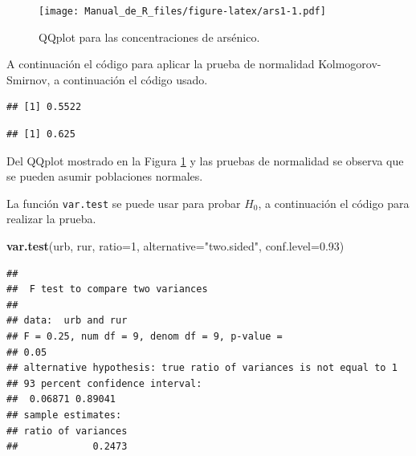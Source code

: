 \documentclass[10pt,]{krantz}
\makeatletter
\newenvironment{Shaded}{\begin{snugshade}}{\end{snugshade}}
\newcommand{\KeywordTok}[1]{\textcolor[rgb]{0.13,0.29,0.53}{\textbf{{#1}}}}
\newcommand{\DataTypeTok}[1]{\textcolor[rgb]{0.13,0.29,0.53}{{#1}}}
\newcommand{\DecValTok}[1]{\textcolor[rgb]{0.00,0.00,0.81}{{#1}}}
\newcommand{\FloatTok}[1]{\textcolor[rgb]{0.00,0.00,0.81}{{#1}}}
\newcommand{\StringTok}[1]{\textcolor[rgb]{0.31,0.60,0.02}{{#1}}}
\newcommand{\NormalTok}[1]{{#1}}
\newenvironment{kframe}{%
\medskip{}
\setlength{\fboxsep}{.8em}
 \def\at@end@of@kframe{}%
 \ifinner\ifhmode%
  \def\at@end@of@kframe{\end{minipage}}%
  \begin{minipage}{\columnwidth}%
 \fi\fi%
 \def\FrameCommand##1{\hskip\@totalleftmargin \hskip-\fboxsep
 \colorbox{shadecolor}{##1}\hskip-\fboxsep
     \hskip-\linewidth \hskip-\@totalleftmargin \hskip\columnwidth}%
 \MakeFramed {\advance\hsize-\width
   \@totalleftmargin\z@ \linewidth\hsize
   \@setminipage}}%
 {\par\unskip\endMakeFramed%
 \at@end@of@kframe}
\renewenvironment{Shaded}{\begin{kframe}}{\end{kframe}}
\makeatother
\begin{document}
\begin{figure}[htbp]
\centering
\texttt{[image: Manual\_de\_R\_files/figure-latex/ars1-1.pdf]}
\caption{\label{fig:ars1}QQplot para las concentraciones de arsénico.}
\end{figure}

A continuación el código para aplicar la prueba de normalidad
Kolmogorov-Smirnov, a continuación el código usado.

\begin{Shaded}
\end{Shaded}

\begin{verbatim}
## [1] 0.5522
\end{verbatim}

\begin{Shaded}
\end{Shaded}

\begin{verbatim}
## [1] 0.625
\end{verbatim}

Del QQplot mostrado en la Figura \ref{fig:ars1} y las pruebas de
normalidad se observa que se pueden asumir poblaciones normales.

La función \texttt{var.test} se puede usar para probar \(H_0\), a
continuación el código para realizar la prueba.

\begin{Shaded}
\begin{Highlighting}[]
\KeywordTok{var.test}\NormalTok{(urb, rur, }\DataTypeTok{ratio=}\DecValTok{1}\NormalTok{, }\DataTypeTok{alternative=}\StringTok{"two.sided"}\NormalTok{,}
         \DataTypeTok{conf.level=}\FloatTok{0.93}\NormalTok{)}
\end{Highlighting}
\end{Shaded}

\begin{verbatim}
## 
##  F test to compare two variances
## 
## data:  urb and rur
## F = 0.25, num df = 9, denom df = 9, p-value =
## 0.05
## alternative hypothesis: true ratio of variances is not equal to 1
## 93 percent confidence interval:
##  0.06871 0.89041
## sample estimates:
## ratio of variances 
##             0.2473
\end{verbatim}
\end{document}
